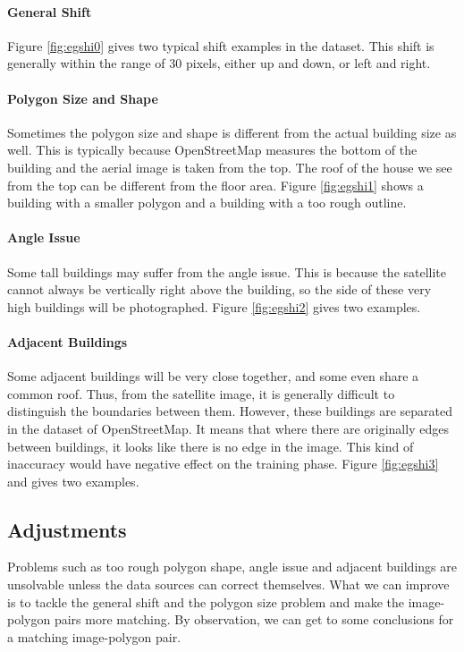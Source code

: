 

\paragraph{General Shift}
Figure \ref{fig:egshi0} gives two typical shift examples in the dataset. This shift is generally within the range of 30 pixels, either up and down, or left and right.

\paragraph{Polygon Size and Shape}
Sometimes the polygon size and shape is different from the actual building size as well. This is typically because OpenStreetMap measures the bottom of the building and the aerial image is taken from the top. The roof of the house we see from the top can be different from the floor area. Figure \ref{fig:egshi1} shows a building with a smaller polygon and a building with a too rough outline.

\paragraph{Angle Issue}
Some tall buildings may suffer from the angle issue. This is because the satellite cannot always be vertically right above the building, so the side of these very high buildings will be photographed. Figure \ref{fig:egshi2} gives two examples.

\paragraph{Adjacent Buildings}
Some adjacent buildings will be very close together, and some even share a common roof. Thus, from the satellite image, it is generally difficult to distinguish the boundaries between them. However, these buildings are separated in the dataset of OpenStreetMap. It means that where there are originally edges between buildings, it looks like there is no edge in the image. This kind of inaccuracy would have  negative effect on the training phase. Figure \ref{fig:egshi3} and gives two examples.

\subsection{Adjustments}\label{adjust}
Problems such as too rough polygon shape, angle issue and adjacent buildings are unsolvable unless the data sources can correct themselves. What we can improve is to tackle the general shift and the polygon size problem and make the image-polygon pairs more matching. By observation, we can get to some conclusions for a matching image-polygon pair.


